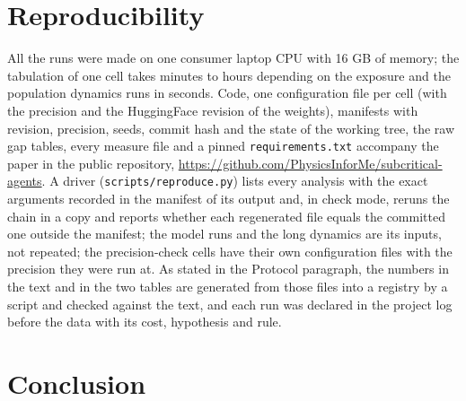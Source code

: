 \documentclass[11pt]{article}
\begin{document}
\section{Reproducibility}

All the runs were made on one consumer laptop CPU with 16 GB of memory; the
tabulation of one cell takes minutes to hours depending on the exposure
and the population dynamics runs in seconds. Code, one configuration file
per cell (with the precision and the HuggingFace revision of the weights),
manifests with revision, precision, seeds, commit hash and the state of the
working tree, the raw gap tables, every measure file and a pinned
\texttt{requirements.txt} accompany the paper in the public repository,
\url{https://github.com/PhysicsInforMe/subcritical-agents}. A driver
(\texttt{scripts/reproduce.py}) lists every analysis with the exact
arguments recorded in the manifest of its output and, in check mode,
reruns the chain in a copy and reports whether each regenerated file
equals the committed one outside the manifest; the model runs and the
long dynamics are its inputs, not repeated; the precision-check cells have
their own configuration files with the precision they were run at. As stated in the Protocol paragraph, the numbers in the text and in the two tables are generated from those files into a registry by a script and checked against the text, and each run was declared in the project log before the data with its cost, hypothesis and rule.

\section{Conclusion}
\end{document}
